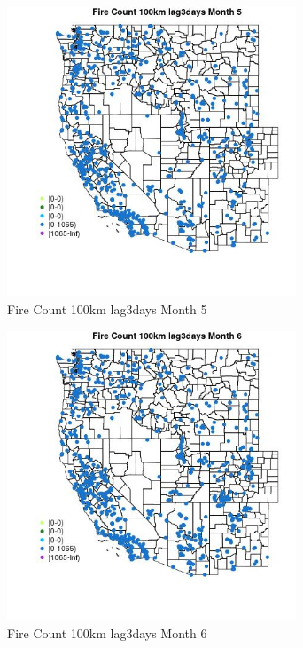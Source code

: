 \begin{figure} 
\centering  
\includegraphics[width=0.77\textwidth]{Code_Outputs/Report_ML_input_PM25_Step4_part_f_de_duplicated_aves_prioritize_24hr_obswNAs_MapObsMo5Fire_Count_100km_lag3days.jpg} 
\caption{\label{fig:Report_ML_input_PM25_Step4_part_f_de_duplicated_aves_prioritize_24hr_obswNAsMapObsMo5Fire_Count_100km_lag3days}Fire Count 100km lag3days Month 5} 
\end{figure} 
 

\begin{figure} 
\centering  
\includegraphics[width=0.77\textwidth]{Code_Outputs/Report_ML_input_PM25_Step4_part_f_de_duplicated_aves_prioritize_24hr_obswNAs_MapObsMo6Fire_Count_100km_lag3days.jpg} 
\caption{\label{fig:Report_ML_input_PM25_Step4_part_f_de_duplicated_aves_prioritize_24hr_obswNAsMapObsMo6Fire_Count_100km_lag3days}Fire Count 100km lag3days Month 6} 
\end{figure} 
 

